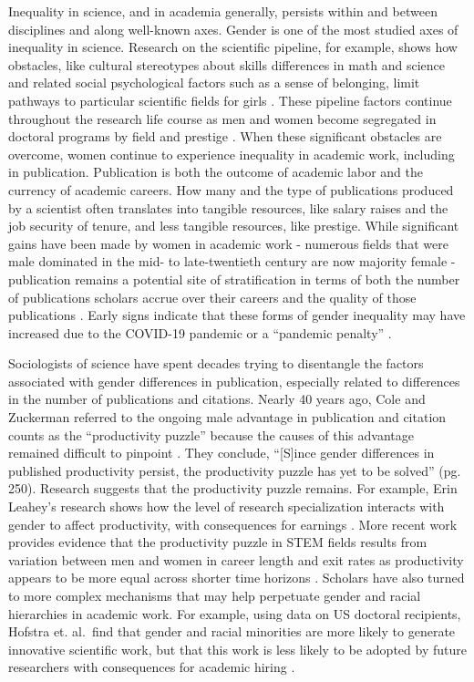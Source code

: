 \documentclass[
  10pt,
  letterpaper,
]{article}
\begin{document}
Inequality in science, and in academia generally, persists within and
between disciplines and along well-known axes. Gender is one of the most
studied axes of inequality in science. Research on the scientific
pipeline, for example, shows how obstacles, like cultural stereotypes
about skills differences in math and science and related social
psychological factors such as a sense of belonging, limit pathways to
particular scientific fields for girls
\citep{cech_professional_2011, ma_math_2021, penner_men_2019}. These
pipeline factors continue throughout the research life course as men and
women become segregated in doctoral programs by field and prestige
\citep{weeden_degrees_2017a}. When these significant obstacles are
overcome, women continue to experience inequality in academic work,
including in publication. Publication is both the outcome of academic
labor and the currency of academic careers. How many and the type of
publications produced by a scientist often translates into tangible
resources, like salary raises and the job security of tenure, and less
tangible resources, like prestige. While significant gains have been
made by women in academic work - numerous fields that were male
dominated in the mid- to late-twentieth century are now majority female
- publication remains a potential site of stratification in terms of
both the number of publications scholars accrue over their careers and
the quality of those publications
\citep{xie_sex_1998, light_gender_2009}. Early signs indicate that these
forms of gender inequality may have increased due to the COVID-19
pandemic or a ``pandemic penalty'' \citep{king_pandemic_2021}.

Sociologists of science have spent decades trying to disentangle the
factors associated with gender differences in publication, especially
related to differences in the number of publications and citations.
Nearly 40 years ago, Cole and Zuckerman referred to the ongoing male
advantage in publication and citation counts as the ``productivity
puzzle'' because the causes of this advantage remained difficult to
pinpoint \citep{cole_productivity_1984}. They conclude, ``{[}S{]}ince
gender differences in published productivity persist, the productivity
puzzle has yet to be solved'' (pg. 250). Research suggests that the
productivity puzzle remains. For example, Erin Leahey's research shows
how the level of research specialization interacts with gender to affect
productivity, with consequences for earnings
\citep{leahey_gender_2006, leahey_not_2007}. More recent work provides
evidence that the productivity puzzle in STEM fields results from
variation between men and women in career length and exit rates as
productivity appears to be more equal across shorter time horizons
\citep{huang_historical_2020}. Scholars have also turned to more complex
mechanisms that may help perpetuate gender and racial hierarchies in
academic work. For example, using data on US doctoral recipients,
Hofstra et. al.~find that gender and racial minorities are more likely
to generate innovative scientific work, but that this work is less
likely to be adopted by future researchers with consequences for
academic hiring \citep{hofstra_diversity_2020}.
\end{document}

